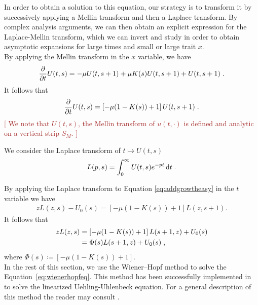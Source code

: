 \documentclass[11pt]{amsart}
\newcommand{\diff}{\,\mathrm{d}}
\newcommand{\ndr}[1]{\textcolor{brown}{[#1]}}
\begin{document}
In order to obtain a solution to this equation, our strategy is to transform it by successively applying a Mellin transform and then a Laplace transform. By complex analysis arguments, we can then obtain an explicit expression for the Laplace-Mellin transform, which we can invert and study in order to obtain asymptotic expansions for large times and small or large trait $x$. \\

By applying the Mellin transform in the $x$ variable, we have
	\begin{equation*}
		\frac{\partial}{\partial t} U(t,s) = - \mu U(t,s+1) + \mu K(s) U(t,s+1) + U(t,s+1)
		\; .
	\end{equation*}
It follows that
    \begin{equation}
        \frac{\partial}{\partial t} U(t,s) = \left[- \mu (1-K(s)) + 1\right] U(t,s+1)
		\; .
        \label{eq:addgrowtheasy}
    \end{equation}
    \ndr{
We note that $U(t,s)$, the Mellin transform of $u(t,\cdot)$ is defined and analytic on a vertical strip $S_M$. }

We consider the Laplace transform of $t \mapsto U(t,s)$
\begin{align}
    L(p,s) = \int_0^\infty U(t,s)e^{-pt}\diff t
    \eqfinp
\end{align}

By applying the Laplace transform to Equation \eqref{eq:addgrowtheasy} in the $t$ variable we have 
\begin{align*}
    zL(z,s) - U_0(s) = \left[- \mu (1-K(s)) + 1\right] L(z,s+1).
\end{align*}
It follows that 
\begin{equation}
\begin{aligned}
    \label{eq:wienerhopfeq}
    zL(z,s) 
    &= \left[- \mu (1-K(s)) + 1\right] L(s+1,z) + U_0(s) \\
    &= \Phi(s) L(s+1,z) + U_0(s)
    \; ,
\end{aligned} 
\end{equation}
where $\Phi(s) \coloneqq \left[- \mu (1-K(s)) + 1\right]$. \\

In the rest of this section, we use the Wiener--Hopf method to solve the Equation~\eqref{eq:wienerhopfeq}. This method has been successfully implemented in \cite{escobedo2007fundamental} to solve the linearized Uehling-Uhlenbeck equation. For a general description of this method the reader may consult \cite{zakharov2012kolmogorov}. 
\medskip
\end{document}
